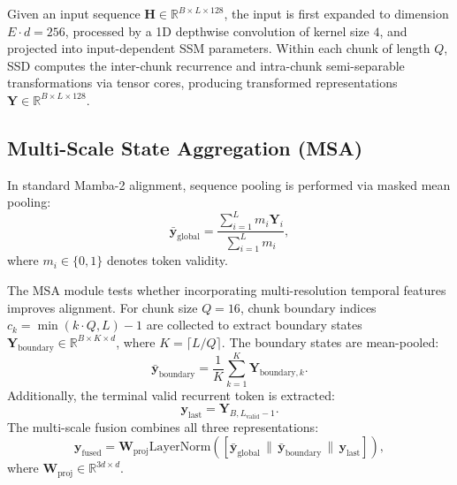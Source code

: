 \documentclass[conference]{IEEEtran}
\begin{document}
Given an input sequence $\mathbf{H} \in \mathbb{R}^{B \times L \times 128}$, the input is first expanded to dimension $E \cdot d = 256$, processed by a 1D depthwise convolution of kernel size $4$, and projected into input-dependent SSM parameters. Within each chunk of length $Q$, SSD computes the inter-chunk recurrence and intra-chunk semi-separable transformations via tensor cores, producing transformed representations $\mathbf{Y} \in \mathbb{R}^{B \times L \times 128}$.

\subsection{Multi-Scale State Aggregation (MSA)}
In standard Mamba-2 alignment, sequence pooling is performed via masked mean pooling:
\begin{equation}
\label{eq:global_mean}
\bar{\mathbf{y}}_{\mathrm{global}} = \frac{\sum_{i=1}^L m_i \mathbf{Y}_i}{\sum_{i=1}^L m_i},
\end{equation}
where $m_i \in \{0, 1\}$ denotes token validity.

The MSA module tests whether incorporating multi-resolution temporal features improves alignment. For chunk size $Q=16$, chunk boundary indices $c_k = \min(k \cdot Q, L) - 1$ are collected to extract boundary states $\mathbf{Y}_{\mathrm{boundary}} \in \mathbb{R}^{B \times K \times d}$, where $K = \lceil L / Q \rceil$. The boundary states are mean-pooled:
\begin{equation}
\label{eq:boundary_mean}
\bar{\mathbf{y}}_{\mathrm{boundary}} = \frac{1}{K}\sum_{k=1}^K \mathbf{Y}_{\mathrm{boundary}, k}.
\end{equation}
Additionally, the terminal valid recurrent token is extracted:
\begin{equation}
\label{eq:terminal_state}
\mathbf{y}_{\mathrm{last}} = \mathbf{Y}_{B, L_{\mathrm{valid}}-1}.
\end{equation}
The multi-scale fusion combines all three representations:
\begin{equation}
\label{eq:msa_fusion}
\mathbf{y}_{\mathrm{fused}} = \mathbf{W}_{\mathrm{proj}} \mathrm{LayerNorm}\left( [\bar{\mathbf{y}}_{\mathrm{global}} \,\|\, \bar{\mathbf{y}}_{\mathrm{boundary}} \,\|\, \mathbf{y}_{\mathrm{last}}] \right),
\end{equation}
where $\mathbf{W}_{\mathrm{proj}} \in \mathbb{R}^{3d \times d}$.
\end{document}
